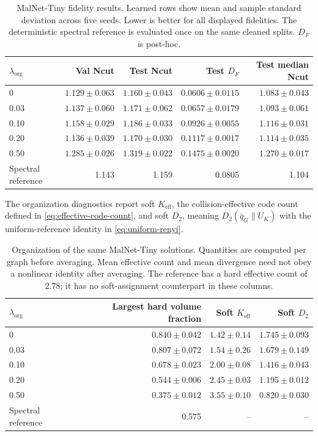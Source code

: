 \begin{table}[t]
\centering\small
\begin{tabular}{lrrrr}
\toprule
$\lambda_{\mathrm{org}}$ & Val Ncut & Test Ncut & Test $D_F$ & Test median Ncut \\
\midrule
0 & $1.129\pm0.063$ & $1.160\pm0.043$ & $0.0606\pm0.0115$ & $1.083\pm0.043$ \\
0.03 & $1.137\pm0.060$ & $1.171\pm0.062$ & $0.0657\pm0.0179$ & $1.093\pm0.061$ \\
0.10 & $1.158\pm0.029$ & $1.186\pm0.033$ & $0.0926\pm0.0055$ & $1.116\pm0.031$ \\
0.20 & $1.136\pm0.039$ & $1.170\pm0.030$ & $0.1117\pm0.0017$ & $1.114\pm0.035$ \\
0.50 & $1.285\pm0.026$ & $1.319\pm0.022$ & $0.1475\pm0.0020$ & $1.270\pm0.017$ \\
\midrule
Spectral reference & 1.143 & 1.159 & 0.0805 & 1.104 \\
\bottomrule
\end{tabular}
\caption{MalNet-Tiny fidelity results. Learned rows show mean and sample standard deviation across five seeds. Lower is better for all displayed fidelities. The deterministic spectral reference is evaluated once on the same cleaned splits. $D_F$ is post-hoc.}
\label{tab:malnet-ncut-results}
\end{table}

The organization diagnostics report soft $K_{\mathrm{eff}}$, the collision-effective code count defined in \cref{eq:effective-code-count}, and soft $D_2$, meaning $D_2(\bar q_G\|U_K)$ with the uniform-reference identity in \cref{eq:uniform-renyi}.

\begin{table}[t]
\centering\small
\begin{tabular}{lrrr}
\toprule
$\lambda_{\mathrm{org}}$ & Largest hard volume fraction & Soft $K_{\mathrm{eff}}$ & Soft $D_2$ \\
\midrule
0 & $0.840\pm0.042$ & $1.42\pm0.14$ & $1.745\pm0.093$ \\
0.03 & $0.807\pm0.072$ & $1.54\pm0.26$ & $1.679\pm0.149$ \\
0.10 & $0.678\pm0.023$ & $2.00\pm0.08$ & $1.416\pm0.043$ \\
0.20 & $0.544\pm0.006$ & $2.45\pm0.03$ & $1.195\pm0.012$ \\
0.50 & $0.375\pm0.012$ & $3.55\pm0.10$ & $0.820\pm0.030$ \\
\midrule
Spectral reference & 0.575 & -- & -- \\
\bottomrule
\end{tabular}
\caption{Organization of the same MalNet-Tiny solutions. Quantities are computed per graph before averaging. Mean effective count and mean divergence need not obey a nonlinear identity after averaging. The reference has a hard effective count of 2.78; it has no soft-assignment counterpart in these columns.}
\label{tab:malnet-organization-results}
\end{table}

